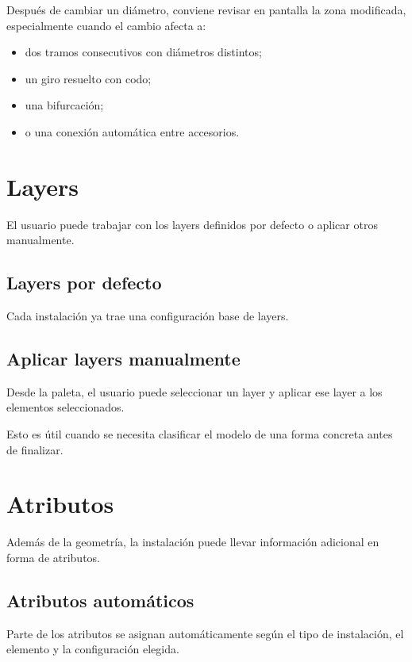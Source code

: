 Después de cambiar un diámetro, conviene revisar en pantalla la zona modificada, especialmente cuando el cambio afecta a:

\begin{itemize}
\item dos tramos consecutivos con diámetros distintos;
\item un giro resuelto con codo;
\item una bifurcación;
\item o una conexión automática entre accesorios.
\end{itemize}

\section{Layers}

El usuario puede trabajar con los layers definidos por defecto o aplicar otros manualmente.

\subsection{Layers por defecto}

Cada instalación ya trae una configuración base de layers.

\subsection{Aplicar layers manualmente}

Desde la paleta, el usuario puede seleccionar un layer y aplicar ese layer a los elementos seleccionados.

Esto es útil cuando se necesita clasificar el modelo de una forma concreta antes de finalizar.


\section{Atributos}

Además de la geometría, la instalación puede llevar información adicional en forma de atributos.

\subsection{Atributos automáticos}

Parte de los atributos se asignan automáticamente según el tipo de instalación, el elemento y la configuración elegida.

